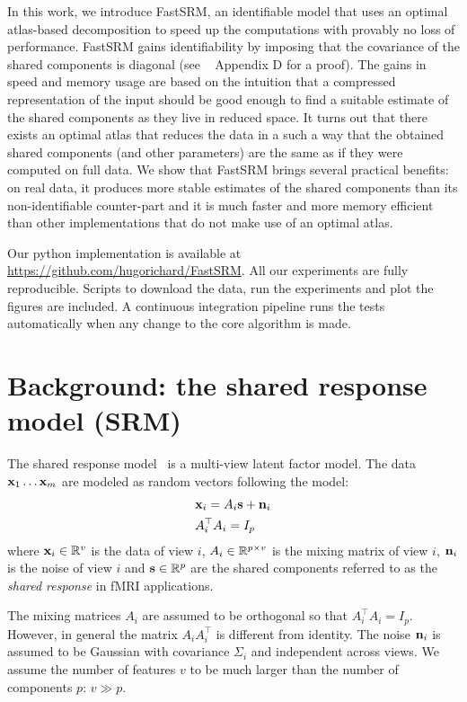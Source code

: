 \documentclass{article}
\begin{document}
In this work, we introduce FastSRM, an identifiable model that uses an optimal
atlas-based decomposition to speed up the computations with provably no loss of
performance.
%
FastSRM gains identifiability by imposing that the covariance of the shared
components is diagonal (see ~\cite{richard2020modeling} Appendix D for a proof).
%
The gains in speed and memory usage are based on the intuition that a compressed
representation of the input should be good enough to find a suitable estimate of
the shared components as they live in reduced space.
%
It turns out that there
exists an optimal atlas that reduces the data in a such a way that the obtained
shared components (and other parameters) are the same as if they were computed
on full data.
%
We show that FastSRM brings several practical benefits: on real data, it produces more stable
estimates of the shared components than its non-identifiable counter-part and 
 it is much faster and more memory
efficient than other implementations that do not make use of an optimal atlas.


Our python implementation is available at
\url{https://github.com/hugorichard/FastSRM}.
%
All our experiments are fully reproducible.
%
Scripts to download the data, run the experiments and plot the figures are
included.
%
A continuous integration pipeline runs the tests
automatically when any change to the core algorithm is made.
%


\section{Background: the shared response model (SRM)}
\label{sec:srm:review}
The shared response model~\cite{chen2015reduced} is a multi-view latent factor
model.
%
The data $\mathbf{x}_1 \dots \mathbf{x}_m$ are modeled as random vectors following the model:
\begin{align}
 &\mathbf{x}_i = A_i \mathbf{s} + \mathbf{n}_i \\
  &A_i^{\top}A_i = I_p
  \label{eq:model:srm}
\end{align}
where $\mathbf{x}_i \in \mathbb{R}^v$ is the data of view $i$, $A_i \in \mathbb{R}^{p \times v}$ is the
mixing matrix of view $i$, $\mathbf{n}_i$ is the noise of view $i$ and $\mathbf{s} \in \mathbb{R}^p$ are the
shared components referred to as the \emph{shared response} in fMRI
applications.
%

The mixing matrices
$A_i$ are assumed to be orthogonal so that $A_i^{\top}A_i = I_p$.
%
However, in
general the matrix $A_i A_i^{\top}$ is different from identity.
%
The noise
$\mathbf{n}_i$ is assumed to be Gaussian with covariance $\Sigma_i$ and independent
across views.
%
We assume the number of features $v$ to be much larger than the
number of components $p$: $v \gg p$.
%
\end{document}
